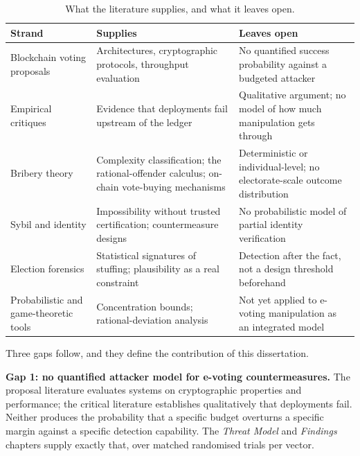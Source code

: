 \begin{table}[htbp]
\centering
\caption{What the literature supplies, and what it leaves open.}
\label{tab:gap}
\small
\begin{tabular}{@{}p{3.5cm}p{5.1cm}p{5.1cm}@{}}
\toprule
\textbf{Strand} & \textbf{Supplies} & \textbf{Leaves open} \\
\midrule
Blockchain voting proposals
  \cite{mccorry2017,ohize2025,rahul2025}
& Architectures, cryptographic protocols, throughput evaluation
& No quantified success probability against a budgeted attacker \\
\addlinespace
Empirical critiques
  \cite{springall2014,specter2020,park2021}
& Evidence that deployments fail upstream of the ledger
& Qualitative argument; no model of how much manipulation gets through \\
\addlinespace
Bribery theory
  \cite{faliszewski2009,becker1968,daian2018}
& Complexity classification; the rational-offender calculus; on-chain vote-buying mechanisms
& Deterministic or individual-level; no electorate-scale outcome distribution \\
\addlinespace
Sybil and identity
  \cite{douceur2002,borge2017}
& Impossibility without trusted certification; countermeasure designs
& No probabilistic model of partial identity verification \\
\addlinespace
Election forensics
  \cite{klimek2012}
& Statistical signatures of stuffing; plausibility as a real constraint
& Detection after the fact, not a design threshold beforehand \\
\addlinespace
Probabilistic and game-theoretic tools
  \cite{chernoff1952,mitzenmacher2017,eyal2014,liu2019}
& Concentration bounds; rational-deviation analysis
& Not yet applied to e-voting manipulation as an integrated model \\
\bottomrule
\end{tabular}
\end{table}

Three gaps follow, and they define the contribution of this
dissertation.

\textbf{Gap 1: no quantified attacker model for e-voting
countermeasures.} The proposal literature evaluates systems on
cryptographic properties and performance; the critical literature
establishes qualitatively that deployments fail. Neither produces the
probability that a specific budget overturns a specific margin against
a specific detection capability. The \emph{Threat Model} and \emph{Findings} chapters supply exactly that, over
\TotalTrials{} matched randomised trials per vector.

